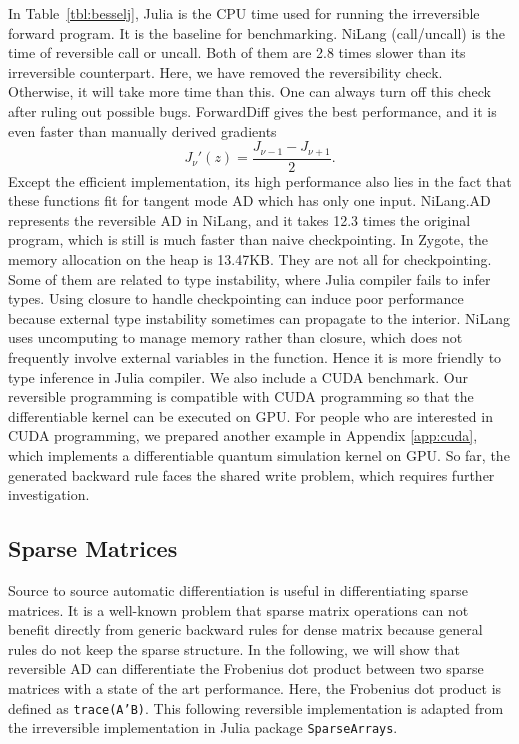 \documentclass[aps,twocolumn,longbibliography,english,superscriptaddress]{revtex4-1}
\newcommand{\<}{\langle}
\renewcommand{\>}{\rangle}
\newcommand{\Tbl}[1]{Table~\ref{#1}}
\newcommand{\App}[1]{Appendix \ref{#1}}
\newcommand{\blue}[1]{[{\bf  \color{blue}{JG: #1}}]}
\theoremstyle{definition}\newtheorem{definition}{\textit{Definition}}
\begin{document}
In \Tbl{tbl:besselj}, Julia is the CPU time used for running the irreversible forward program. It is the baseline for benchmarking.
NiLang (call/uncall) is the time of reversible call or uncall. Both of them are 2.8 times slower than its irreversible counterpart. Here, we have removed the reversibility check. Otherwise, it will take more time than this. One can always turn off this check after ruling out possible bugs.
ForwardDiff gives the best performance, and it is even faster than manually derived gradients
\begin{equation}
    J_{\nu}'(z) = \frac{J_{\nu-1} - J_{\nu+1}}{2}.
\end{equation}
Except the efficient implementation, its high performance also lies in the fact that these functions fit for tangent mode AD which has only one input.
NiLang.AD represents the reversible AD in NiLang, and it takes 12.3 times the original program, which is still is much faster than naive checkpointing.
In Zygote, the memory allocation on the heap is 13.47KB. They are not all for checkpointing. Some of them are related to type instability, where Julia compiler fails to infer types.
Using closure to handle checkpointing can induce poor performance because external type instability sometimes can propagate to the interior.
NiLang uses uncomputing to manage memory rather than closure, which does not frequently involve external variables in the function.
Hence it is more friendly to type inference in Julia compiler.
We also include a CUDA benchmark. Our reversible programming is compatible with CUDA programming so that the differentiable kernel can be executed on GPU.
For people who are interested in CUDA programming, we prepared another example in \App{app:cuda}, which implements a differentiable quantum simulation kernel on GPU.
So far, the generated backward rule faces the shared write problem, which requires further investigation.

\subsection{Sparse Matrices}
Source to source automatic differentiation is useful in differentiating sparse matrices. It is a well-known problem that sparse matrix operations can not benefit directly from generic backward rules for dense matrix because general rules do not keep the sparse structure.
In the following, we will show that reversible AD can differentiate the Frobenius dot product between two sparse matrices with a state of the art performance. Here, the Frobenius dot product is defined as \texttt{trace(A'B)}.
This following reversible implementation is adapted from the irreversible implementation in Julia package \texttt{SparseArrays}.
\end{document}
